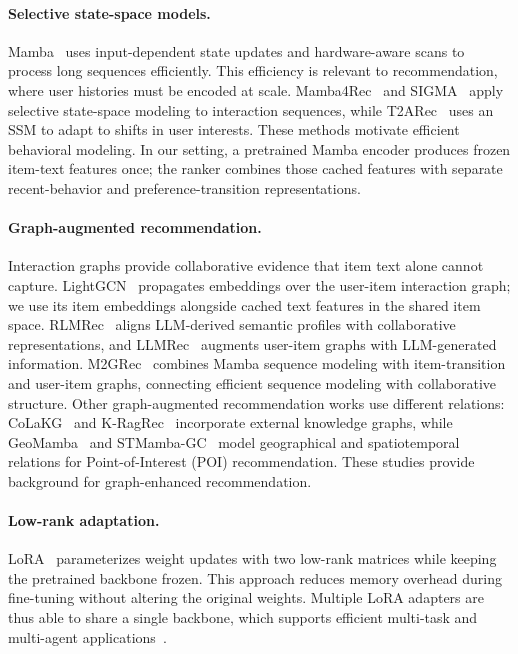 ﻿\documentclass[sigconf,anonymous,review]{acmart}
\begin{document}
\paragraph{Selective state-space models.}
Mamba~\citep{Mamba} uses input-dependent state updates and hardware-aware scans to process long sequences efficiently. This efficiency is relevant to recommendation, where user histories must be encoded at scale. Mamba4Rec~\citep{Mamba4Rec} and SIGMA~\citep{SIGMA} apply selective state-space modeling to interaction sequences, while T2ARec~\citep{T2ARec} uses an SSM to adapt to shifts in user interests. These methods motivate efficient behavioral modeling. In our setting, a pretrained Mamba encoder produces frozen item-text features once; the ranker combines those cached features with separate recent-behavior and preference-transition representations.

\paragraph{Graph-augmented recommendation.}
Interaction graphs provide collaborative evidence that item text alone cannot capture. LightGCN~\citep{LightGCN} propagates embeddings over the user-item interaction graph; we use its item embeddings alongside cached text features in the shared item space. RLMRec~\citep{RLMRec} aligns LLM-derived semantic profiles with collaborative representations, and LLMRec~\citep{LLMRec} augments user-item graphs with LLM-generated information. M2GRec~\citep{M2GRec} combines Mamba sequence modeling with item-transition and user-item graphs, connecting efficient sequence modeling with collaborative structure. Other graph-augmented recommendation works use different relations: CoLaKG~\citep{CoLaKG} and K-RagRec~\citep{K-RagRec} incorporate external knowledge graphs, while GeoMamba~\citep{GeoMamba} and STMamba-GC~\citep{STMamba-GC} model geographical and spatiotemporal relations for Point-of-Interest (POI) recommendation. These studies provide background for graph-enhanced recommendation.


\paragraph{Low-rank adaptation.}
LoRA~\citep{LoRA} parameterizes weight updates with two low-rank matrices while keeping the pretrained backbone frozen. This approach reduces memory overhead during fine-tuning without altering the original weights. Multiple LoRA adapters are thus able to share a single backbone, which supports efficient multi-task and multi-agent applications~\citep{MapCoder-Lite}.
\end{document}
